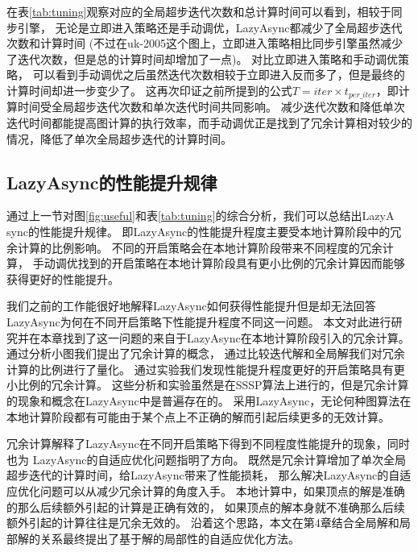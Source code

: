 在表\ref{tab:tuning}观察对应的全局超步迭代次数和总计算时间可以看到，相较于同步引擎，
无论是立即进入策略还是手动调优，LazyAsync都减少了全局超步迭代次数和计算时间
(不过在uk-2005这个图上，立即进入策略相比同步引擎虽然减少了迭代次数，但是总的计算时间却增加了一点)。
对比立即进入策略和手动调优策略， 可以看到手动调优之后虽然迭代次数相较于立即进入反而多了，但是最终的计算时间却进一步变少了。
这再次印证之前所提到的公式$T=iter \times t_{per\_iter}$，即计算时间受全局超步迭代次数和单次迭代时间共同影响。
减少迭代次数和降低单次迭代时间都能提高图计算的执行效率，而手动调优正是找到了冗余计算相对较少的情况，降低了单次全局超步迭代的计算时间。


\subsection{LazyAsync的性能提升规律}

通过上一节对图\ref{fig:useful}和表\ref{tab:tuning}的综合分析，我们可以总结出LazyA sync的性能提升规律。
即LazyAsync的性能提升程度主要受本地计算阶段中的冗余计算的比例影响。
不同的开启策略会在本地计算阶段带来不同程度的冗余计算，
手动调优找到的开启策略在本地计算阶段具有更小比例的冗余计算因而能够获得更好的性能提升。

我们之前的工作能很好地解释LazyAsync如何获得性能提升但是却无法回答LazyAsync为何在不同开启策略下性能提升程度不同这一问题。
本文对此进行研究并在本章找到了这一问题的来自于LazyAsync在本地计算阶段引入的冗余计算。
通过分析小图我们提出了冗余计算的概念，
通过比较迭代解和全局解我们对冗余计算的比例进行了量化。
通过实验我们发现性能提升程度更好的开启策略具有更小比例的冗余计算。
这些分析和实验虽然是在SSSP算法上进行的，但是冗余计算的现象和概念在LazyAsync中是普遍存在的。
采用LazyAsync，无论何种图算法在本地计算阶段都有可能由于某个点上不正确的解而引起后续更多的无效计算。

冗余计算解释了LazyAsync在不同开启策略下得到不同程度性能提升的现象，同时也为
LazyAsync的自适应优化问题指明了方向。
既然是冗余计算增加了单次全局超步迭代的计算时间，给LazyAsync带来了性能损耗，
那么解决LazyAsync的自适应优化问题可以从减少冗余计算的角度入手。
本地计算中，如果顶点的解是准确的那么后续额外引起的计算是正确有效的，
如果顶点的解本身就不准确那么后续额外引起的计算往往是冗余无效的。
沿着这个思路，本文在第4章结合全局解和局部解的关系最终提出了基于解的局部性的自适应优化方法。


